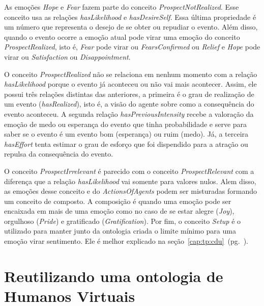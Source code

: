 As emoções \emph{Hope} e \emph{Fear} fazem parte do conceito
\emph{ProspectNotRealized}. Esse conceito usa as relações \emph{hasLikelihood}
e \emph{hasDesireSelf}. Essa última propriedade é um número que
representa o desejo de se obter ou repudiar o evento. Além disso, quando o
evento ocorre a emoção atual pode virar uma emoção do conceito
\emph{ProspectRealized}, isto é, \emph{Fear} pode virar ou
\emph{FearsConfirmed} ou \emph{Relief} e \emph{Hope} pode virar ou
\emph{Satisfaction} ou \emph{Disappointment}.

O conceito \emph{ProspectRealized} não se relaciona em nenhum momento com a
relação \emph{hasLikelihood} porque o evento já aconteceu ou não vai mais
acontecer. Assim, ele possui três relações distintas das anteriores, a
primeira é o grau de realização de um evento (\emph{hasRealized}), isto é, a
visão do agente sobre como a consequência do evento aconteceu. A segunda
relação \emph{hasPreviousIntensity} recebe a valoração da emoção de medo ou
esperança do evento que tinha probabilidade e serve para saber se o evento é
um evento bom (esperança) ou ruim (medo). Já, a terceira \emph{hasEffort}
tenta estimar o grau de esforço que foi dispendido para a atração ou repulsa
da consequência do evento.

O conceito \emph{ProspectIrrelevant} é parecido com o conceito
\emph{ProspectRelevant} com a diferença que a relação \emph{hasLikelihood} vai
somente para valores nulos. Alem disso, as emoções desse conceito e do
\emph{ActionsOfAgents} podem ser misturadas formando um conceito de composto.
A composição é quando uma emoção pode ser encaixada em mais de uma emoção
como no caso de se estar alegre (\emph{Joy}), orgulhoso (\emph{Pride}) e
gratificado (\emph{Gratification}). Por fim, o conceito \emph{Setup}
 é o utilizado para manter junto da
ontologia criada o limite mínimo para uma emoção virar sentimento\dev{}. Ele é
melhor explicado na seção~\ref{cap:tp:cdu}~(pg.~\pageref{cap:tp:cdu}).


\section{Reutilizando uma ontologia de Humanos Virtuais} \label{cap:tp:ruodhv}

